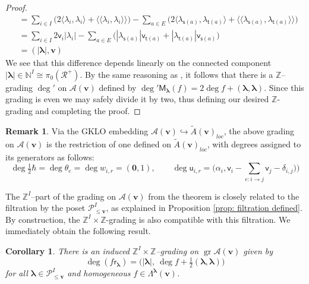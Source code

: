 \documentclass[11pt,reqno]{amsart}
\renewcommand{\mathbf}{\mathbold}
\numberwithin{equation}{section}
\newtheorem{Corollary}[equation]{Corollary}
\theoremstyle{definition}
\newtheorem{Remark}[equation]{Remark}
\newcommand{\cA}{\mathcal{A}}
\newcommand{\cP}{\mathcal{P}}
\newcommand{\cR}{\mathcal{R}}
\newcommand{\bv}{\mathbf{v}}
\newcommand{\NN}{\mathbb{N}}
\newcommand{\ZZ}{\mathbb{Z}}
\renewcommand{\tilde}[1]{\widetilde{#1}}
\DeclareMathOperator{\gr}{gr}
\renewcommand{\bv}{\mathbf{v}} %
\newcommand{\sv}{\mathsf{v}}
\newcommand{\M}{\mathsf{M}}
\newcommand{\sfu}{\mathsf{u}}
\newcommand{\sfr}{{\mathsf{r}}}
\newcommand{\source}{\mathsf{s}}
\newcommand{\target}{\mathsf{t}}
\newcommand{\vertexset}{I}
\newcommand{\arrowset}{E}
\newcommand{\GT}{\Lambda}
\newcommand{\Partitions}{\cP}
\newcommand{\bla}{{\boldsymbol{\lambda}}}
\newcommand{\qzast}{\cA}
\newcommand{\GKLO}[1]{\tilde{A}(#1)_{loc}}
\begin{document}
\begin{proof}
\begin{align*}
& = \sum_{i \in \vertexset}\big(2\langle \lambda_i,\lambda_i\rangle + \langle\langle \lambda_i, \lambda_i \rangle\rangle \big) - \sum_{a \in \arrowset} \big( 2\langle \lambda_{\source(a)}, \lambda_{\target(a)}\rangle +\langle \langle \lambda_{\source(a)}, \lambda_{\target(a)}\rangle\rangle \big) \\
& = \sum_{i \in \vertexset} 2 \sv_i |\lambda_i| - \sum_{a \in \arrowset}\big( |\lambda_{\source(a)}| \sv_{\target(a)} + |\lambda_{\target(a)}| \sv_{\source(a)} \big) \\
& = (|\bla|, \bv)
\end{align*}
We see that this difference depends linearly on the connected component $|\bla| \in \NN^{\vertexset} \cong \pi_0(\cR^+)$.  By the same reasoning as \cite[Remark 2.8(2)]{BFN1}, it follows that there is a $\ZZ$--grading $\deg'$ on $\qzast(\bv)$ defined by $\deg' \M_{\bla}(f) = 2 \deg f + (\bla,\bla)$. Since this grading is even we may safely divide it by two, thus defining our desired $\ZZ$-grading and completing the proof.
\end{proof}

\begin{Remark}
    \label{rmk:gradingunderGKLO}
    Via the GKLO embedding $\qzast(\bv) \hookrightarrow \GKLO{\bv}$, the  above grading on $\qzast(\bv)$ is the restriction of one defined on $\GKLO{\bv}$, with degrees assigned to its generators as follows:
    $$
    \deg \tfrac{1}{2}\hbar = \deg \theta_e = \deg w_{i,r} = (\mathbf{0}, 1), \qquad \deg \sfu_{i,r} = \big( \alpha_i, \sv_i - \sum_{e : i \rightarrow j} \sv_j -\delta_{i,j}) \big)
    $$
\end{Remark}


The $\ZZ^\vertexset$--part of the grading on $\qzast(\bv)$ from the theorem is closely related to the filtration  by the poset $\Partitions_{\leq \bv}^\vertexset$, as explained in  Proposition \ref{prop: filtration defined}. By construction, the $\ZZ^\vertexset\times \ZZ$-grading is also compatible with this filtration. We immediately  obtain the following result.
\begin{Corollary}
There is an induced $\ZZ^\vertexset \times \ZZ$--grading on $\gr \qzast(\bv)$ given by $$\deg (f \sfr_{\bla}) = \big( |\bla|, \ \deg f +  \tfrac{1}{2}(\bla,\bla) \big)$$ for all $\bla \in \Partitions_{\leq \bv}^\vertexset$ and homogeneous $f \in \GT^\bla(\bv)$.
\end{Corollary}
\end{document}
